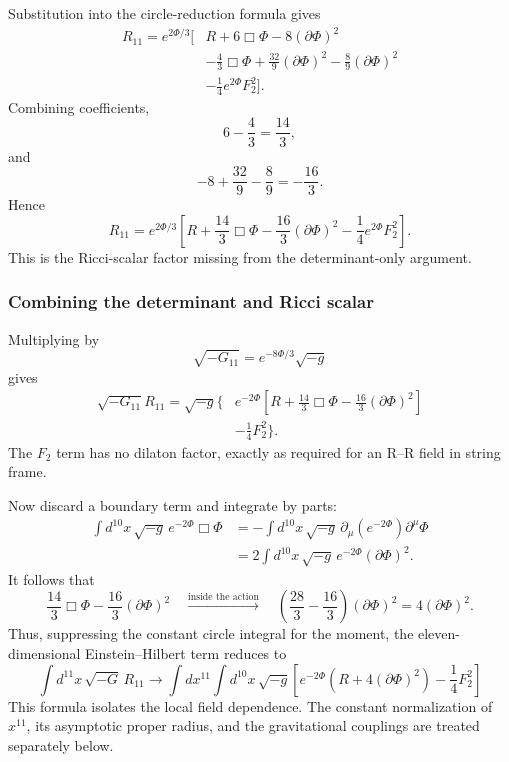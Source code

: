 \documentclass[
  10pt,
  a4paper,
  openany]{book}
\begin{document}
Substitution into the circle-reduction formula gives \[
\begin{aligned}
R_{11}
=e^{2\Phi/3}\Bigg[
&R+6\Box\Phi-8(\partial\Phi)^2\\
&-\frac43\Box\Phi
+\frac{32}{9}(\partial\Phi)^2
-\frac89(\partial\Phi)^2\\
&-\frac14e^{2\Phi}F_2^2
\Bigg].
\end{aligned}
\] Combining coefficients, \[
6-\frac43=\frac{14}{3},
\] and \[
-8+\frac{32}{9}-\frac89
=-\frac{16}{3}.
\] Hence \[
\boxed{
R_{11}
=e^{2\Phi/3}
\left[
R
+\frac{14}{3}\Box\Phi
-\frac{16}{3}(\partial\Phi)^2
-\frac14e^{2\Phi}F_2^2
\right]
}.
\] This is the Ricci-scalar factor missing from the determinant-only
argument.

\subsubsection{Combining the determinant and Ricci
scalar}\label{combining-the-determinant-and-ricci-scalar}

Multiplying by \[
\sqrt{-G_{11}}
=e^{-8\Phi/3}\sqrt{-g}
\] gives \[
\begin{aligned}
\sqrt{-G_{11}}R_{11}
=\sqrt{-g}\Bigg\{
&e^{-2\Phi}
\left[
R+\frac{14}{3}\Box\Phi-\frac{16}{3}(\partial\Phi)^2
\right]\\
&-\frac14F_2^2
\Bigg\}.
\end{aligned}
\] The \(F_2\) term has no dilaton factor, exactly as required for an
R--R field in string frame.

Now discard a boundary term and integrate by parts: \[
\begin{aligned}
\int d^{10}x\,\sqrt{-g}\,
e^{-2\Phi}\Box\Phi
&=
-\int d^{10}x\,\sqrt{-g}\,
\partial_\mu(e^{-2\Phi})\partial^\mu\Phi\\
&=
2\int d^{10}x\,\sqrt{-g}\,
e^{-2\Phi}(\partial\Phi)^2.
\end{aligned}
\] It follows that \[
\frac{14}{3}\Box\Phi
-\frac{16}{3}(\partial\Phi)^2
\quad\xrightarrow{\text{inside the action}}\quad
\left(
\frac{28}{3}-\frac{16}{3}
\right)(\partial\Phi)^2
=4(\partial\Phi)^2.
\] Thus, suppressing the constant circle integral for the moment, the
eleven-dimensional Einstein--Hilbert term reduces to \[
\boxed{
\int d^{11}x\,\sqrt{-G}\,R_{11}
\longrightarrow
\int dx^{11}
\int d^{10}x\,\sqrt{-g}
\left[
e^{-2\Phi}
\left(R+4(\partial\Phi)^2\right)
-\frac14F_2^2
\right]
}
\] This formula isolates the local field dependence. The constant
normalization of \(x^{11}\), its asymptotic proper radius, and the
gravitational couplings are treated separately below.
\end{document}
